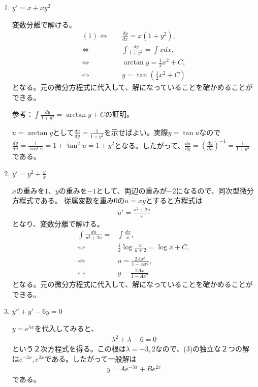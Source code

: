 \documentclass[report,paper=a4, fontsize=12pt, line_length=16cm, number_of_lines=33,dvipdfmx]{jlreq}
\numberwithin{equation}{section}
\begin{document}
\begin{enumerate}
\setlength{\itemsep}{10mm}
\item $\displaystyle y'=x+xy^2$


変数分離で解ける。
\begin{align*}
(1)\Leftrightarrow\quad &\frac{dy}{dx}=x(1+y^2),\\
\Leftrightarrow\quad  &\int \frac{dy}{1+y^2}=\int x dx,\\
\Leftrightarrow\quad &\arctan y=\frac12 x^2+C,\\
\Leftrightarrow\quad &y=\tan\left(\frac12 x^2+C\right)
\end{align*}
となる。元の微分方程式に代入して、解になっていることを確かめることができる。

参考：$\int \frac{dy}{1+y^2}=\arctan y +C$の証明。

$u=\arctan y$として$\frac{du}{dy}=\frac{1}{1+y^2}$を示せばよい。実際$y=\tan u$なので$\frac{dy}{du}=\frac{1}{\cos^2u}=1+\tan^2u=1+y^2$となる。したがって、$\frac{du}{dy}=\left(\frac{dy}{du}\right)^{-1}=\frac{1}{1+y^2}$である。


\item $\displaystyle y'=y^2+\frac{y}{x}$

$x$の重みを$1$、$y$の重みを$-1$として、両辺の重みが$-2$になるので、同次型微分方程式である。
従属変数を重み$0$の$u=xy$とすると方程式は
\begin{align*}
  u'=\frac{u^2+2u}{x}
\end{align*}
となり、変数分離で解ける。
\begin{align*}
    \int \frac{du}{u^2+2u}=&\int \frac{dx}{x},\\
    \Leftrightarrow \quad& \frac12\log\frac{u}{u+2}=\log x +C,\\
    \Leftrightarrow \quad& u=\frac{2Ax^2}{1-Ax^2},\\
    \Leftrightarrow \quad& y=\frac{2Ax}{1-Ax^2}
\end{align*}
となる。元の微分方程式に代入して、解になっていることを確かめることができる。
\item \qquad $\displaystyle y''+y'-6y=0$

$y=e^{\lambda x}$を代入してみると、
\begin{align*}
    \lambda^2+\lambda-6=0
\end{align*}
という２次方程式を得る。この根は$\lambda=-3,2$なので、(3)の独立な２つの解は$e^{-3x},e^{2x}$である。したがって一般解は
\begin{align*}
    y=Ae^{-3x}+Be^{2x}
\end{align*}
である。


\end{enumerate}
\end{document}
